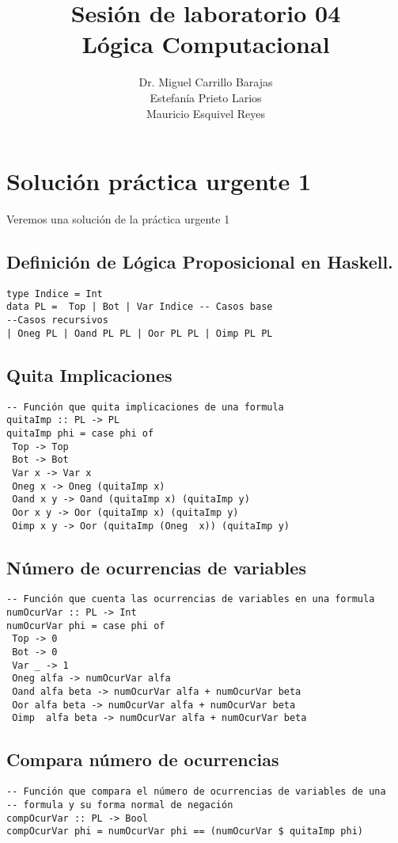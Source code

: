 \documentclass[11pt]{article}
\author{Dr. Miguel Carrillo Barajas \\
Estefanía Prieto Larios \\
Mauricio Esquivel Reyes \\
}
\date{}
\title{Sesión de laboratorio 04 \\
Lógica Computacional}
\begin{document}
\maketitle
\section{Solución práctica urgente 1}
\label{sec:orgc7733af}
Veremos una solución de la práctica urgente 1
\subsection{Definición de Lógica Proposicional en Haskell.}
\label{sec:orgddf4fc3}
\begin{verbatim}
type Indice = Int
data PL =  Top | Bot | Var Indice -- Casos base
--Casos recursivos
| Oneg PL | Oand PL PL | Oor PL PL | Oimp PL PL 
\end{verbatim}
\subsection{Quita Implicaciones}
\label{sec:org02100b4}
\begin{verbatim}
-- Función que quita implicaciones de una formula
quitaImp :: PL -> PL
quitaImp phi = case phi of
 Top -> Top
 Bot -> Bot
 Var x -> Var x
 Oneg x -> Oneg (quitaImp x)
 Oand x y -> Oand (quitaImp x) (quitaImp y)
 Oor x y -> Oor (quitaImp x) (quitaImp y)
 Oimp x y -> Oor (quitaImp (Oneg  x)) (quitaImp y)
\end{verbatim}
\subsection{Número de ocurrencias de variables}
\label{sec:org6986fea}
\begin{verbatim}
-- Función que cuenta las ocurrencias de variables en una formula
numOcurVar :: PL -> Int
numOcurVar phi = case phi of
 Top -> 0
 Bot -> 0
 Var _ -> 1
 Oneg alfa -> numOcurVar alfa
 Oand alfa beta -> numOcurVar alfa + numOcurVar beta
 Oor alfa beta -> numOcurVar alfa + numOcurVar beta
 Oimp  alfa beta -> numOcurVar alfa + numOcurVar beta
\end{verbatim}
\subsection{Compara número de ocurrencias}
\label{sec:orgb68a7f5}
\begin{verbatim}
-- Función que compara el número de ocurrencias de variables de una
-- formula y su forma normal de negación
compOcurVar :: PL -> Bool
compOcurVar phi = numOcurVar phi == (numOcurVar $ quitaImp phi)
\end{verbatim}
\end{document}
